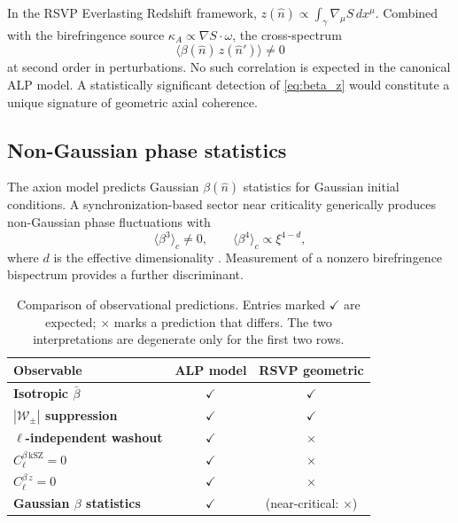 \documentclass[12pt]{article}
\theoremstyle{definition}
\newcommand{\kA}{\kappa_A}
\newcommand{\Wpm}{\mathcal{W}_\pm}
\begin{document}
In the RSVP Everlasting Redshift framework, $z(\hat{n})\propto
\int_\gamma\nabla_\mu S\,dx^\mu$.
Combined with the birefringence source $\kA\propto\nabla S\cdot\omega$,
the cross-spectrum
\begin{equation}
  \langle\beta(\hat{n})\,z(\hat{n}')\rangle\neq0
  \label{eq:beta_z}
\end{equation}
at second order in perturbations.
No such correlation is expected in the canonical ALP model.
A statistically significant detection of \eqref{eq:beta_z} would
constitute a unique signature of geometric axial coherence.

\subsection{Non-Gaussian phase statistics}

The axion model predicts Gaussian $\beta(\hat{n})$ statistics for Gaussian
initial conditions.
A synchronization-based sector near criticality generically produces
non-Gaussian phase fluctuations with
\begin{equation}
  \langle\beta^3\rangle_c\neq0,
  \qquad
  \langle\beta^4\rangle_c\propto\xi^{4-d},
\end{equation}
where $d$ is the effective dimensionality \cite{Goldenfeld1992,Zinn-Justin2002}.
Measurement of a nonzero birefringence bispectrum \cite{Yadav2012}
provides a further discriminant.

\begin{table}[h]
\centering
\small
\renewcommand{\arraystretch}{1.35}
\begin{tabular}{>{\bfseries}lcc}
  \toprule
  Observable & ALP model & RSVP geometric \\
  \midrule
  Isotropic $\bar\beta$ & $\checkmark$ & $\checkmark$ \\
  $|\Wpm|$ suppression & $\checkmark$ & $\checkmark$ \\
  $\ell$-independent washout & $\checkmark$ & $\times$ \\
  $C_\ell^{\beta\,\mathrm{kSZ}}=0$ & $\checkmark$ & $\times$ \\
  $C_\ell^{\beta\,z}=0$ & $\checkmark$ & $\times$ \\
  Gaussian $\beta$ statistics & $\checkmark$ & (near-critical: $\times$) \\
  \bottomrule
\end{tabular}
\caption{Comparison of observational predictions.
  Entries marked $\checkmark$ are expected;
  $\times$ marks a prediction that differs.
  The two interpretations are degenerate only for the first two rows.}
\label{tab:discriminants}
\end{table}
\end{document}
